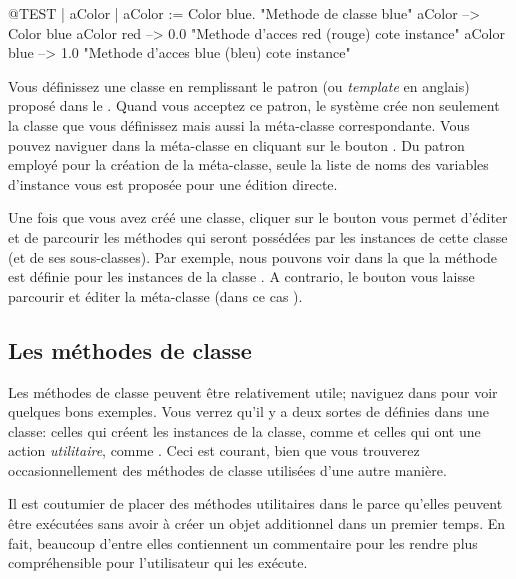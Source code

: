 \documentclass[a4paper,10pt,twoside]{book}
\begin{document}
\begin{code}{@TEST | aColor |}
aColor := Color blue.               "Methode de classe blue"
aColor        --> Color blue
aColor red  --> 0.0         "Methode d'acces red (rouge) cote instance"
aColor blue --> 1.0        "Methode d'acces blue (bleu) cote instance"
\end{code}

Vous d\'efinissez une classe en remplissant le patron (ou \emph{template} en anglais) propos\'e
dans le .
Quand vous acceptez ce patron, le syst\`eme cr\'ee non seulement la classe
que vous d\'efinissez mais aussi la m\'eta-classe correspondante.
Vous pouvez naviguer dans la m\'eta-classe en cliquant sur le bouton .
Du patron employ\'e pour la cr\'eation de la m\'eta-classe, seule la
liste de noms des variables d'instance vous est propos\'ee pour une \'edition directe.  

Une fois que vous avez cr\'e\'e une classe, cliquer sur
le bouton  vous permet d'\'editer et de parcourir les
m\'ethodes qui seront poss\'ed\'ees par les instances de cette classe (et de ses sous-classes). Par exemple, nous pouvons voir dans la  que 
la m\'ethode  est d\'efinie pour les instances de la classe .
A contrario, le bouton  vous laisse parcourir et \'editer
la m\'eta-classe (dans ce cas ).

\subsection{Les m\'ethodes de classe} 

Les m\'ethodes de classe peuvent \^etre relativement utile; naviguez dans  pour voir quelques bons exemples.
Vous verrez qu'il y a deux sortes de  d\'efinies dans une classe: celles qui cr\'eent les instances de la classe, comme  et celles qui ont une action \emph{utilitaire}, 
comme .
Ceci est courant, bien que vous trouverez occasionnellement des m\'ethodes
de classe utilis\'ees d'une autre mani\`ere.

Il est coutumier de placer des m\'ethodes utilitaires dans le  parce qu'elles peuvent \^etre ex\'ecut\'ees
sans avoir \`a cr\'eer un objet additionnel dans un premier temps.
En fait, beaucoup d'entre elles contiennent un commentaire pour les rendre plus compr\'ehensible pour l'utilisateur qui les ex\'ecute.
\end{document}
